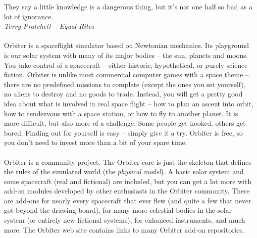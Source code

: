 \documentclass[Orbiter User Manual.tex]{subfiles}
\begin{document}
They say a little knowledge is a dangerous thing, but it’s not one half so bad as a lot of ignorance.\\
\textit{Terry Pratchett – Equal Rites}\\
\\
Orbiter is a spaceflight simulator based on Newtonian mechanics. Its playground is our solar system with many of its major bodies – the sun, planets and moons. You take control of a spacecraft – either historic, hypothetical, or purely science fiction. Orbiter is unlike most commercial computer games with a space theme – there are no predefined missions to complete (except the ones you set yourself), no aliens to destroy and no goods to trade. Instead, you will get a pretty good idea about what is involved in real space flight – how to plan an ascent into orbit, how to rendezvous with a space station, or how to fly to another planet. It is more difficult, but also more of a challenge. Some people get hooked, others get bored. Finding out for yourself is easy – simply give it a try. Orbiter is free, so you don’t need to invest more than a bit of your spare time.\\
\\
Orbiter is a community project. The Orbiter core is just the skeleton that defines the rules of the simulated world (the \textit{physical model}). A basic solar system and some spacecraft (real and fictional) are included, but you can get a lot more with add-on modules developed by other enthusiasts in the Orbiter community. There are add-ons for nearly every spacecraft that ever flew (and quite a few that never got beyond the drawing board), for many more celestial bodies in the solar system (or entirely new fictional systems), for enhanced instruments, and much more. The Orbiter web site contains links to many Orbiter add-on repositories.
\end{document}
